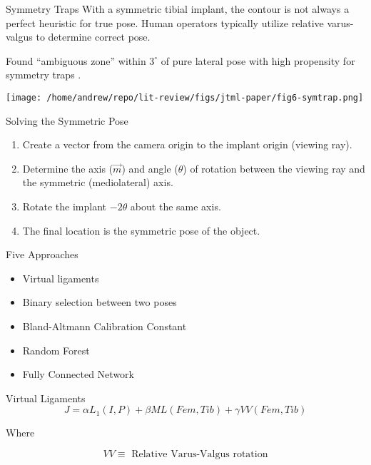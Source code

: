 \documentclass[presentation, aspectratio=1610]{beamer}
\begin{document}
\begin{frame}[label={sec:org51a012c}]{Symmetry Traps}
With a symmetric tibial implant, the contour is not always a perfect heuristic for true pose. Human operators typically utilize relative varus-valgus to determine correct pose.

Found ``ambiguous zone'' within \(3^{\circ}\) of pure lateral pose with high propensity for symmetry traps \autocite{jensenJointTrackMachine2022}.

\begin{center}
\texttt{[image: /home/andrew/repo/lit-review/figs/jtml-paper/fig6-symtrap.png]}
\end{center}
\end{frame}
\begin{frame}[label={sec:org647c124}]{Solving the Symmetric Pose}
\begin{enumerate}
\item Create a vector from the camera origin to the implant origin (viewing ray).
\item Determine the axis (\(\vec{m}\)) and angle (\(\theta\)) of rotation between the viewing ray and the symmetric (mediolateral) axis.
\item Rotate the implant \(-2\theta\) about the same axis.
\item The final location is the symmetric pose of the object.
\end{enumerate}
\end{frame}

\begin{frame}[label={sec:org9afd31c}]{Five Approaches}
\begin{itemize}
\item Virtual ligaments
\item Binary selection between two poses
\item Bland-Altmann Calibration Constant
\item Random Forest
\item Fully Connected Network
\end{itemize}
\end{frame}

\begin{frame}[label={sec:orgd5014cc}]{Virtual Ligaments}
\begin{equation*}
  J = \alpha L_{1}(I,P) + \beta ML(Fem,Tib) + \gamma VV(Fem,Tib)
\end{equation*}

Where

\begin{equation*}
  VV \equiv \text{  Relative Varus-Valgus rotation}
\end{equation*}
\end{frame}
\end{document}
